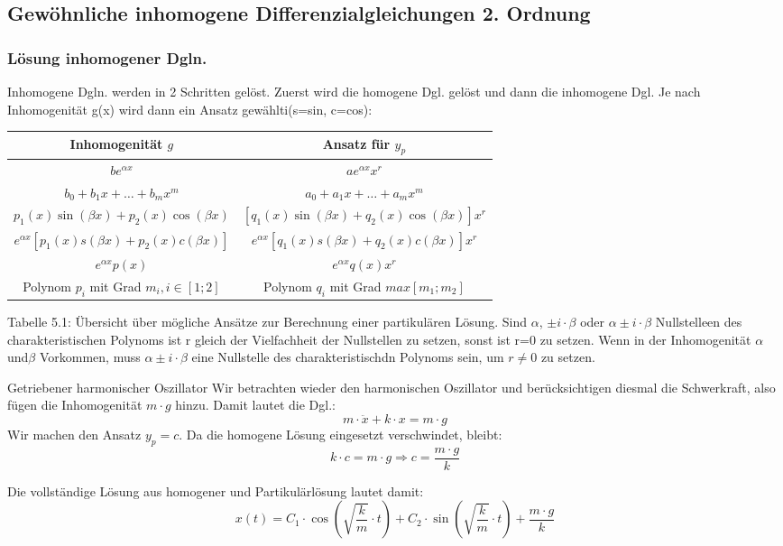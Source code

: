 \documentclass[
	11pt, %
]{beamer}
\begin{document}
\subsection{Gew\"ohnliche inhomogene Differenzialgleichungen 2. Ordnung}
\begin{frame}
\frametitle{L\"osung inhomogener Dgln.}
	Inhomogene Dgln. werden in 2 Schritten gel\"ost. Zuerst wird die homogene Dgl. gel\"ost und dann die inhomogene Dgl. Je nach Inhomogenit\"at g(x) wird dann ein Ansatz gew\"ahlti(s=sin, c=cos):\\
\begin{tabular}{c|c} 
Inhomogenität $g$ & Ansatz für $y_p$ \\
\hline$b e^{\alpha x}$ & $a e^{\alpha x}x^r$ \\
\hline$b_0+b_1 x+\ldots+b_m x^m$ & $a_0+a_1 x+\ldots+a_m x^m$ \\
	\hline$p_1(x) \sin (\beta x)+p_2(x) \cos (\beta x)$ & $[q_1(x)\sin (\beta x)+ q_2(x)\cos (\beta x)] x^r$ \\
	\hline$e^{\alpha x}\left[p_1(x) s(\beta x)+p_2(x) c(\beta x)\right]$ & $e^{\alpha x}\left[ q_1(x)s(\beta x)+ q_2(x)c(\beta x)\right]x^r$ \\
\hline$e^{\alpha x} p(x)$ & $e^{\alpha x} q(x) x^r$ \\
	Polynom $p_i$ mit Grad $m_i, i\in[1; 2]$ & Polynom $q_i$ mit Grad $max[m_1;m_2]$
\end{tabular}

Tabelle 5.1: Übersicht über mögliche Ansätze zur Berechnung einer partikulären Lösung.
Sind $\alpha$, $\pm i\cdot\beta$ oder $\alpha\pm i\cdot\beta$ Nullstelleen des charakteristischen Polynoms ist r gleich der Vielfachheit der Nullstellen zu setzen, sonst ist r=0 zu setzen. Wenn in der Inhomogenit\"at $\alpha$ und$ \beta$ Vorkommen, muss $\alpha\pm i\cdot\beta$ eine Nullstelle des charakteristischdn Polynoms sein, um $r\neq 0$ zu setzen. 
\end{frame}
\begin{frame}
	\begin{exampleblock}{Getriebener harmonischer Oszillator}
		Wir betrachten wieder den harmonischen Oszillator und ber\"ucksichtigen diesmal die Schwerkraft, also f\"ugen die Inhomogenit\"at $m\cdot g$ hinzu. Damit lautet die Dgl.:
		\begin{equation}
			m\cdot\ddot x + k\cdot x = m\cdot g
		\end{equation}
		Wir machen den Ansatz $y_p=c$. Da die homogene L\"osung eingesetzt verschwindet, bleibt:
		\begin{equation}
			k\cdot c = m\cdot g \Rightarrow c = \frac{m\cdot g}{k}
		\end{equation}

		Die vollst\"andige L\"osung aus homogener und Partikul\"arl\"osung lautet damit:
		\begin{equation}
			x(t) = C_1\cdot \cos\left(\sqrt{\frac{k}{m}}\cdot t\right) + C_2\cdot \sin\left(\sqrt{\frac{k}{m}}\cdot t\right) + \frac{m\cdot g}{k}
		\end{equation}
	\end{exampleblock}
\end{frame}
\end{document}
